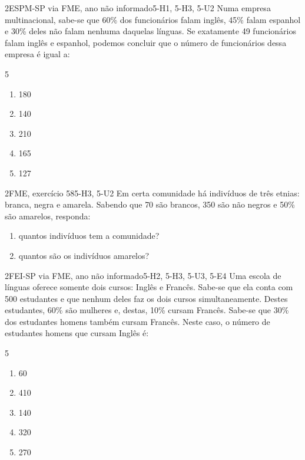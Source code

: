\begin{questao}{2}{ESPM-SP via FME, ano não informado}{5-H1, 5-H3, 5-U2}\label{u5:espm10}
Numa empresa multinacional, sabe-se que 60\% dos funcionários falam inglês, 45\% falam espanhol e 30\% deles não falam nenhuma daquelas línguas. Se exatamente 49 funcionários falam inglês e espanhol, podemos concluir que o número de funcionários dessa empresa é igual a:
\begin{multicols}{5}
\begin{enumerate}[label=\alph*)]
  \item 180
  \item 140
  \item 210
  \item 165
  \item 127
\end{enumerate}
\end{multicols}
\end{questao}

\begin{questao}{2}{FME, exercício 58}{5-H3, 5-U2}\label{u5:fme58}
Em certa comunidade há indivíduos de três etnias: branca, negra e amarela. Sabendo que 70 são brancos, 350 são não negros e 50\% são amarelos, responda:
\begin{enumerate}[label=\alph*)]
  \item quantos indivíduos tem a comunidade?
  \item quantos são os indivíduos amarelos?
\end{enumerate}
\end{questao}

\begin{questao}{2}{FEI-SP via FME, ano não informado}{5-H2, 5-H3, 5-U3, 5-E4}\label{u5:fei8}
Uma escola de línguas oferece somente dois cursos: Inglês e Francês. Sabe-se que ela conta com 500 estudantes e que nenhum deles faz os dois cursos simultaneamente. Destes estudantes, 60\% são mulheres e, destas, 10\% cursam Francês. Sabe-se que 30\% dos estudantes homens também cursam Francês. Neste caso, o número de estudantes homens que cursam Inglês é:
\begin{multicols}{5}
\begin{enumerate}[label=\alph*)]
  \item 60
  \item 410
  \item 140
  \item 320
  \item 270
\end{enumerate}
\end{multicols}
\end{questao}

